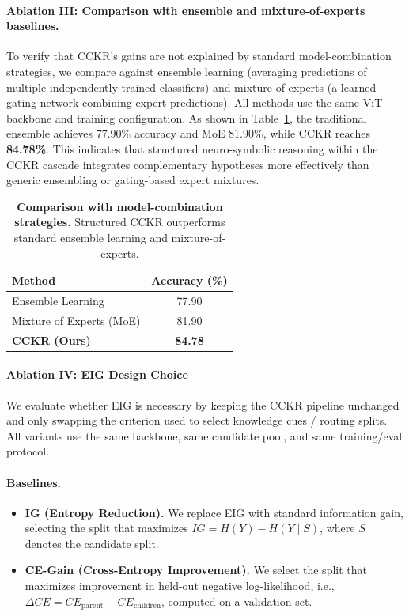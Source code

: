 \documentclass{article}
\begin{document}
\paragraph{Ablation III: Comparison with ensemble and mixture-of-experts baselines.}
To verify that CCKR's gains are not explained by standard model-combination
strategies, we compare against ensemble learning (averaging
predictions of multiple independently trained classifiers) and
mixture-of-experts (a learned gating network combining expert
predictions). All methods use the same ViT backbone and training
configuration. As shown in Table~\ref{tab:ensemble_ablation}, the
traditional ensemble achieves 77.90\% accuracy and MoE 81.90\%, while CCKR
reaches \textbf{84.78\%}. This indicates that structured neuro-symbolic
reasoning within the CCKR cascade integrates complementary hypotheses more
effectively than generic ensembling or gating-based expert mixtures.

\begin{table}[h]
\centering
\small
\setlength{\tabcolsep}{6pt}
\caption{\textbf{Comparison with model-combination strategies.} Structured
CCKR outperforms standard ensemble learning and mixture-of-experts.}
\label{tab:ensemble_ablation}
\begin{tabular}{lc}
\toprule
\textbf{Method} & \textbf{Accuracy (\%)} \\
\midrule
Ensemble Learning        & 77.90 \\
Mixture of Experts (MoE) & 81.90 \\
\textbf{CCKR (Ours)}     & \textbf{84.78} \\
\bottomrule
\end{tabular}
\end{table}

\paragraph{Ablation IV: EIG Design Choice}
\label{app:eig_baselines}
We evaluate whether EIG is necessary by keeping the CCKR pipeline unchanged and only swapping the criterion used to
select knowledge cues / routing splits. All variants use the same backbone, same candidate pool, and same training/eval protocol.

\paragraph{Baselines.}
\begin{itemize}
    \item \textbf{IG (Entropy Reduction).} We replace EIG with standard information gain, selecting the split that maximizes
    $IG = H(Y)-H(Y\mid S)$, where $S$ denotes the candidate split.
    \item \textbf{CE-Gain (Cross-Entropy Improvement).} We select the split that maximizes improvement in held-out
    negative log-likelihood, i.e., $\Delta CE = CE_{\text{parent}}-CE_{\text{children}}$, computed on a validation set.
\end{itemize}
\end{document}
